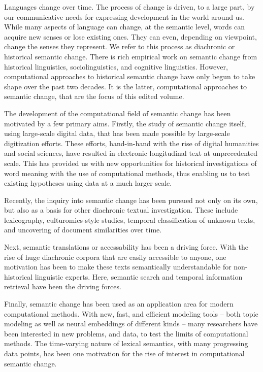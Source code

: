 \begin{refsection}
Languages change over time. The process of change is driven, to a large part, by our communicative needs for expressing development in the world around us. While many aspects of language can change, at the semantic level, words can acquire new senses or lose existing ones. They can even, depending on viewpoint, change the senses they represent. We refer to this process as diachronic or historical semantic change. 
There is rich empirical work on semantic change from historical linguistics, sociolinguistics, and cognitive linguistics. However, computational approaches to historical semantic change have only begun to take shape over the past two decades. It is the latter, computational approaches to semantic change, that are the focus of this edited volume.\largerpage[2]

The development of the computational field of semantic change has been motivated by a few primary aims.
Firstly, the study of semantic change itself, using large-scale digital data, that has been made possible by large-scale digitization efforts. These efforts, hand-in-hand with the rise of digital humanities and social sciences, have resulted in electronic longitudinal text at unprecedented scale. This has provided us with new opportunities for historical investigations of word meaning with the use of computational methods, thus enabling us to test existing hypotheses using data at a much larger scale. 

Recently, the inquiry into semantic change has been pursued not only on its own, but also as a basis for other diachronic textual investigation. These include lexicography, culturomics-style studies, temporal classification of unknown texts, and uncovering of document similarities over time. 

Next, semantic translations or accessability has been a driving force. With the rise of huge diachronic corpora that are easily accessible to anyone, one motivation  
has been to make these texts semantically understandable for non-historical linguistic experts. Here, semantic search and temporal information retrieval have been the driving forces.

Finally, semantic change has been used as an application area for modern computational methods. With new, fast, and efficient modeling tools -- both topic modeling as well as neural embeddings of different kinds -- many researchers have been interested in new problems, and data, to test the limits of computational methods.  The time-varying nature of lexical semantics, with many progressing data points, has been one motivation for the rise of interest in computational semantic change.


\end{refsection}
